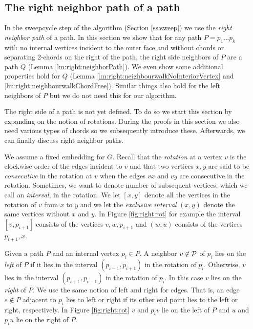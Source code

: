 
\subsection{The right neighbor path of a path}
\thispagestyle{plain}
  \label{ss:rightNeighbour}
  In the sweepcycle step of the algorithm (Section \ref{ss:sweep}) we use the \emph{right neighbor path} of a path. In this section we show that for any path $P = p_1 \ldots p_k$ with no internal vertices incident to the outer face and without chords or separating 2-chords on the right of the path, the right side neighbors of $P$ are a path $Q$ (Lemma \ref{lm:right:neighborPath}).
  We even show some additional properties hold for $Q$ (Lemma  \ref{lm:right:neighbourwalkNoInteriorVertex} and \ref{lm:right:neighbourwalkChordFree}).
  Similar things also hold for the left neighbors of $P$ but we do not need this for our algorithm.

  The right side of a path is not yet defined. To do so we start this section by expanding on the notion of rotations. During the proofs in this section we also need various types of chords so we subsequently introduce these. Afterwards, we can finally discuss right neighbor paths.

    We assume a fixed embedding for $G$. Recall that the \emph{rotation} at a vertex $v$ is the clockwise order of the edges incident to $v$ and that two vertices $x, y$ are said to be \emph{consecutive} in the rotation at $v$ when the edges $vx$ and $vy$ are consecutive in the rotation.
    Sometimes, we want to denote number of subsequent vertices, which we call an \emph{interval}, in the rotation. We let $[x,y]$ denote all the vertices in the rotation of $v$ from $x$ to $y$ and we let the \emph{exclusive interval} $(x,y)$ denote the same vertices without $x$ and $y$. In Figure \ref{fig:right:rot} for example the interval $[v,p_{i+1}]$ consists of the vertices $v,w,p_{i+1}$ and $(w,u)$ consists of the vertices $p_{i+1}, x$.

    Given a path $P$ and an internal vertex $p_i \in P$. A neighbor $v \not \in \mathcal{P}$ of $p_i$ lies on the \emph{left} of $P$ if it lies in the interval $(p_{i-1}, p_{i+1})$ in the rotation of $p_{i}$. Otherwise, $v$ lies in the interval $(p_{i+1}, p_{i-1})$ in the rotation of $p_i$. In this case $v$ lies on the \emph{right} of $P$.
    We use the same notion of left and right for edges. That is, an edge $e\nin P$ adjacent to $p_i$ lies to left or right if its other end point lies to the left or right, respectively. In Figure \ref{fig:right:rot} $v$ and $p_i v$ lie on the left of $P$ and $u$ and $p_i u$ lie on the right of $P$.

